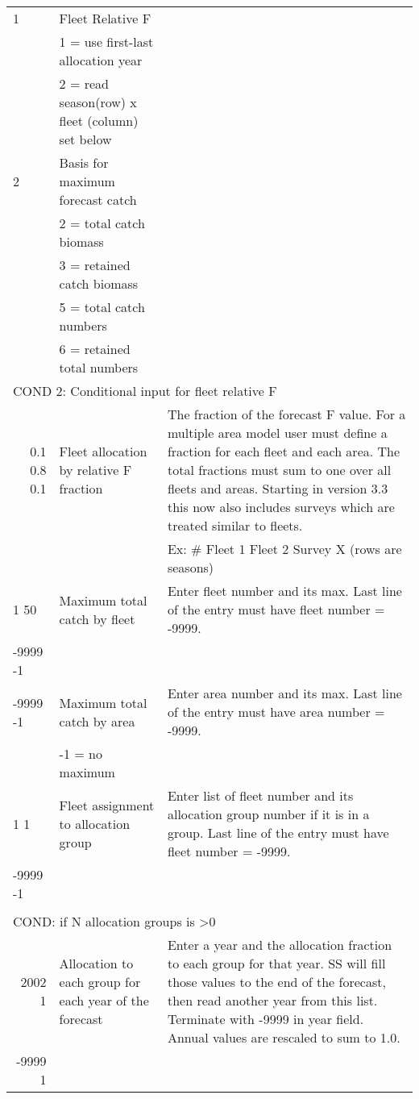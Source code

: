 \begin{landscape}
{\begin{longtable}{p{3.2cm} p{7cm} p{10.8cm}}
 \hline
 1 & Fleet Relative F & \Tstrut\\
   & 1 = use first-last allocation year & \\
   & 2 = read season(row) x fleet (column) set below & \Bstrut\\

 \hline 
 2 & Basis for maximum forecast catch &  \Tstrut\\
   & 2 = total catch biomass & \\
   & 3 = retained catch biomass & \\
   & 5 = total catch numbers & \\
   & 6 = retained total numbers & \Bstrut\\
    
 \hline 
 \multicolumn{3}{l}{COND 2: Conditional input for fleet relative F} \Tstrut\\
 \multicolumn{1}{r}{0.1 0.8 0.1}  & Fleet allocation by relative F fraction & The fraction of the forecast F value.  For a multiple area model user must define a fraction for each fleet and each area.  The total fractions must sum to one over all fleets and areas.  Starting in version 3.3 this now also includes surveys which are treated similar to fleets.\\
   &  &  Ex: \# Fleet 1  Fleet 2  Survey X (rows are seasons) \Bstrut\\ 

  \hline
  1 50 & Maximum total catch by fleet & \multirow{1}{1cm}[-0.25cm]{\parbox{11cm}{Enter fleet number and its max. Last line of the entry must have fleet number = -9999.}} \Tstrut\\
  -9999 -1 & & \Bstrut\\
  \hline
  
  -9999 -1 & Maximum total catch by area & \multirow{1}{1cm}[-0.25cm]{\parbox{11cm}{Enter area number and its max. Last line of the entry must have area number = -9999.}} \Tstrut\\
     & -1 = no maximum & \Bstrut\\
     
  \hline
  1 1  & Fleet assignment to allocation group & \multirow{1}{1cm}[-0.25cm]{\parbox{11cm}{Enter list of fleet number and its allocation group number if it is in a group. Last line of the entry must have fleet number = -9999.}} \Tstrut\\
  -9999 -1  & &  \\ \Bstrut\\ 
    
  \hline
  \multicolumn{3}{l}{COND: if N allocation groups is >0 } \Tstrut\\
  \multicolumn{1}{r}{2002 1}  & Allocation to each group for each year of the forecast & Enter a year and the allocation fraction to each group for that year.  SS will fill those values to the end of the forecast, then read another year from this list.  Terminate with -9999 in year field. Annual values are rescaled to sum to 1.0. \\
  \multicolumn{1}{r}{-9999 1} & & \Bstrut\\
  

\end{longtable}}
\end{landscape}
